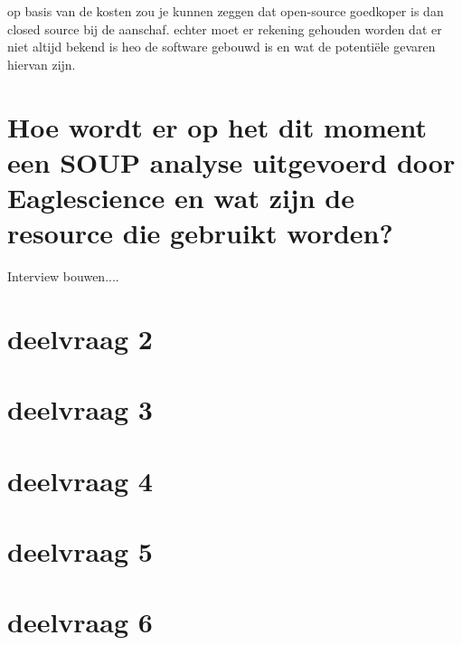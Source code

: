 op basis van de kosten zou je kunnen zeggen dat open-source goedkoper is dan closed source bij de aanschaf. echter moet er rekening gehouden worden dat er niet altijd bekend is heo de software gebouwd is en wat de potenti\"ele gevaren hiervan zijn.

\section{Hoe wordt er op het dit moment een SOUP analyse uitgevoerd door Eaglescience en wat zijn de resource die gebruikt worden?}

Interview bouwen....


\lipsum[10]


\section{deelvraag 2}

\lipsum[10]

\section{deelvraag 3}

\lipsum[10]

\section{deelvraag 4}

\lipsum[10]
\section{deelvraag 5}

\lipsum[10]


\section{deelvraag 6}
\lipsum[10]

